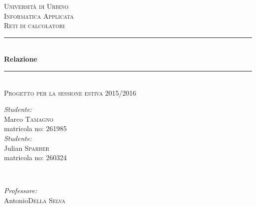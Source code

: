 ﻿\documentclass[11pt, a4paper, titlepage, block]{article}
\begin{document}
	\begin{titlepage}

		\newcommand{\HRule}{\rule{\linewidth}{0.5mm}} %

		\center %


		\textsc{\LARGE Universit\`a di Urbino}\\[1.5cm] %
		\textsc{\Large Informatica Applicata}\\[0.5cm] %
		\textsc{\large Reti di calcolatori}\\[0.5cm] %



		\HRule \\[0.4cm]
		{ \huge \bfseries Relazione}\\[0.2cm] %
		\HRule \\[0.4cm]
		\textsc{\large Progetto per la sessione estiva 2015/2016}
		\\[2cm]

		\begin{minipage}{\textwidth}
			\begin{flushleft}
				\emph{Studente:}\\
				Marco \textsc{Tamagno}\\ %
				matricola no: 261985
				\\[1cm]
				\emph{Studente:}\\
				Julian \textsc{Sparber}\\ %
				matricola no: 260324\\
			\end{flushleft}
		\end{minipage}\\[3cm]

		\begin{minipage}{\textwidth}
			\begin{flushright}
				\emph{Professore:} \\
				 Antonio\textsc{Della Selva}\\ %
			\end{flushright}
		\end{minipage}\\[4cm]


\end{titlepage}
\end{document}
